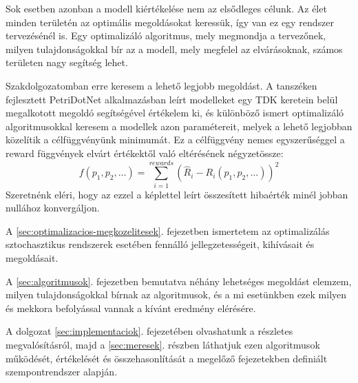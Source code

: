 Sok esetben azonban a modell kiértékelése nem az elsődleges célunk. Az élet minden területén az optimális megoldásokat keressük, így van ez egy rendszer tervezésénél is. Egy optimalizáló algoritmus, mely megmondja a tervezőnek, milyen tulajdonságokkal bír az a modell, mely megfelel az elvárásoknak, számos területen nagy segítség lehet.

Szakdolgozatomban erre keresem a lehető legjobb megoldást. A tanszéken fejlesztett PetriDotNet alkalmazásban leírt modelleket egy TDK keretein belül megalkotott megoldó\cite{SpdnTDK} segítségével értékelem ki, és különböző ismert optimalizáló algoritmusokkal keresem a modellek azon paramétereit, melyek a lehető legjobban közelítik a célfüggvényünk minimumát. Ez a célfüggvény nemes egyszerűséggel a reward függvények elvárt értékektől való eltérésének négyzetössze:
\begin{equation}
	\label{eq:celfgv}
	f(p_1,p_2,...)=\sum_{i=1}^{rewards}\left( \hat{R}_i-R_i(p_1,p_2,...)\right) ^2
\end{equation}
Szeretnénk eléri, hogy az ezzel a képlettel leírt összesített hibaérték minél jobban nullához konvergáljon.

A \ref{sec:optimalizacios-megkozelitesek}. fejezetben ismertetem az optimalizálás sztochasztikus rendszerek esetében fennálló jellegzetességeit, kihívásait és megoldásait.

A \ref{sec:algoritmusok}. fejezetben bemutatva néhány lehetséges megoldást elemzem, milyen tulajdonságokkal bírnak az algoritmusok, és a mi esetünkben ezek milyen és mekkora befolyással vannak a kívánt eredmény elérésére.

A dolgozat \ref{sec:implementaciok}. fejezetében olvashatunk a részletes megvalósításról, majd a \ref{sec:meresek}. részben láthatjuk ezen algoritmusok működését, értékelését és összehasonlítását a megelőző fejezetekben definiált szempontrendszer alapján.